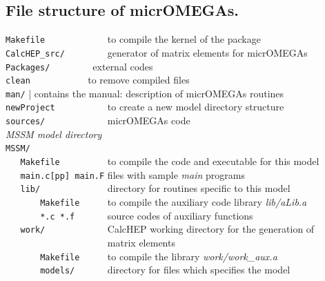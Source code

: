 \documentclass[12pt,a4paper]{article}
\begin{document}
\subsection{File structure of micrOMEGAs.}
\label{file_structure}
\verb|Makefile            |  to compile the kernel of the package               \\
\verb|CalcHEP_src/        |        generator of matrix elements for micrOMEGAs    \\
\verb|Packages/        |        external codes    \\
\verb|clean           | to remove compiled files \\
\verb|man/|         |   contains the manual: description of micrOMEGAs routines \\
\verb|newProject          |     to create a new model directory   structure                           \\
\verb|sources/            |        micrOMEGAs code                               \\
{\it MSSM model directory}                                                          \\
\verb|MSSM/               |                                                      \\
\verb|   Makefile         |  to compile the code and executable for  this model \\
\verb|   main.c[pp] main.F|       files with sample {\it main} programs      \\
\verb|   lib/             |      directory for routines specific to this model   \\
\verb|       Makefile     |   to compile the auxiliary code library {\it lib/aLib.a}    \\
\verb|       *.c *.f      |      source codes of auxiliary functions             \\
\verb|   work/            |              CalcHEP working directory for the generation of   \\
\verb|                    |             matrix elements                                    \\
\verb|       Makefile     |  to compile the library {\it work/work\_aux.a}           \\ 
\verb|       models/      | directory for files  which specifies the model\\ 
\end{document}
